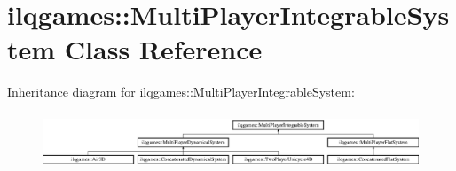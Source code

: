 \hypertarget{classilqgames_1_1_multi_player_integrable_system}{}\section{ilqgames\+:\+:Multi\+Player\+Integrable\+System Class Reference}
\label{classilqgames_1_1_multi_player_integrable_system}
Inheritance diagram for ilqgames\+:\+:Multi\+Player\+Integrable\+System\+:\begin{figure}[H]
\begin{center}
\leavevmode
\includegraphics[height=1.673307cm]{classilqgames_1_1_multi_player_integrable_system}
\end{center}
\end{figure}
